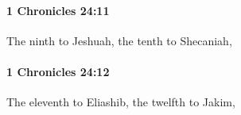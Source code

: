 		\paragraph{1 Chronicles 24:11} %
			\label{1CHRONICLES-24-11}

			The ninth to Jeshuah, the tenth to Shecaniah,


		\paragraph{1 Chronicles 24:12} %
			\label{1CHRONICLES-24-12}

			The eleventh to Eliashib, the twelfth to Jakim,


